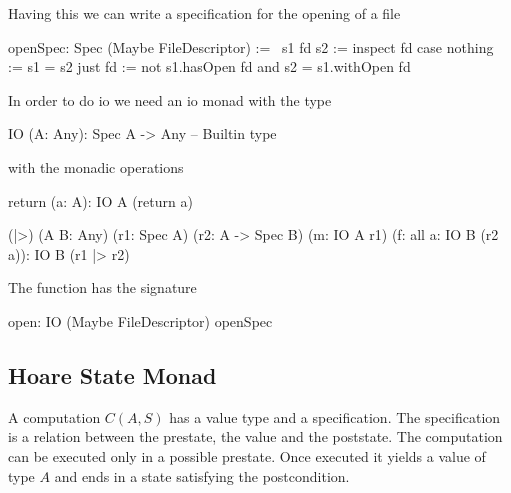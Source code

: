 Having this we can write a specification for the opening of a file

\begin{alba}
    openSpec: Spec (Maybe FileDescriptor) :=
        \ s1 fd s2 :=
            inspect fd case
                nothing :=
                    s1 = s2
                just fd :=
                    not s1.hasOpen fd
                    and
                    s2 = s1.withOpen fd
\end{alba}

In order to do io we need an io monad with the type
\begin{alba}
    IO (A: Any): Spec A -> Any  -- Builtin type
\end{alba}
%
with the monadic operations
\begin{alba}
    return (a: A): IO A (return a)

    (|>)
        (A B: Any)
        (r1: Spec A)
        (r2: A -> Spec B)
        (m: IO A r1)
        (f: all a: IO B (r2 a)):
        IO B (r1 |> r2)
\end{alba}




The  function has the signature
%
\begin{alba}
    open: IO (Maybe FileDescriptor) openSpec
\end{alba}



\begin{alba}
\end{alba}






\subsection{Hoare State Monad}

A computation $C(A,S)$ has a value type and a specification. The specification
is a relation between the prestate, the value and the poststate. The
computation can be executed only in a possible prestate. Once executed it
yields a value of type $A$ and ends in a state satisfying the postcondition.

